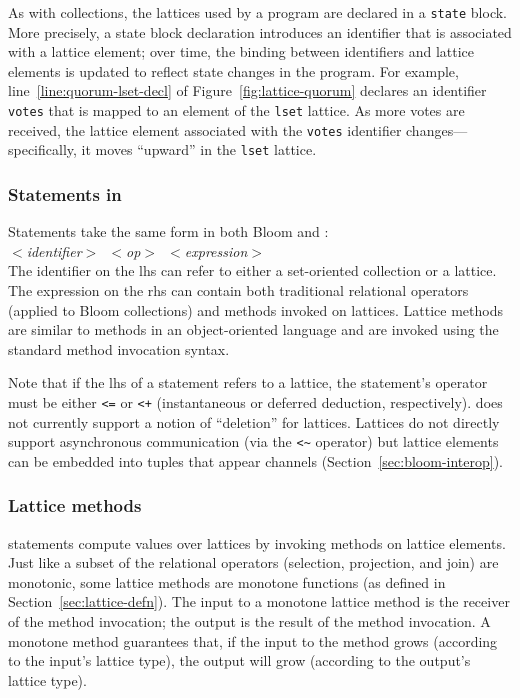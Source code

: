 As with collections, the lattices used by a \lang program are declared in a
\texttt{state} block. More precisely, a state block declaration introduces an
identifier that is associated with a lattice element; over time, the binding
between identifiers and lattice elements is updated to reflect state changes in
the program. For example, line~\ref{line:quorum-lset-decl} of
Figure~\ref{fig:lattice-quorum} declares an identifier \texttt{votes} that is
mapped to an element of the \texttt{lset} lattice. As more votes are received,
the lattice element associated with the \texttt{votes} identifier
changes---specifically, it moves ``upward'' in the \texttt{lset} lattice.

\subsubsection{Statements in \lang}
Statements take the same form in both Bloom and \lang:
 \\ \noindent
\mbox{\hspace{0.25in}\emph{$<$identifier$>$ $<$op$>$
    $<$expression$>$}}\\ \noindent
The identifier on the lhs can refer to either a set-oriented collection or a
lattice. The expression on the rhs can contain both traditional relational
operators (applied to Bloom collections) and methods invoked on lattices.
Lattice methods are similar to methods in an object-oriented language and are
invoked using the standard method invocation syntax.

Note that if the lhs of a statement refers to a lattice, the statement's
operator must be either \verb|<=| or \verb|<+| (instantaneous or deferred
deduction, respectively). \lang does not currently support a notion of
``deletion'' for lattices. Lattices do not directly support asynchronous
communication (via the \verb|<~| operator) but lattice elements can be embedded
into tuples that appear channels (Section~\ref{sec:bloom-interop}).

\subsubsection{Lattice methods}
\lang statements compute values over lattices by invoking methods on lattice
elements. Just like a subset of the relational operators (selection, projection,
and join) are monotonic, some lattice methods are monotone functions (as defined
in Section~\ref{sec:lattice-defn}). The input to a monotone lattice method is
the receiver of the method invocation; the output is the result of the method
invocation. A monotone method guarantees that, if the input to the method grows
(according to the input's lattice type), the output will grow (according to the
output's lattice type).


